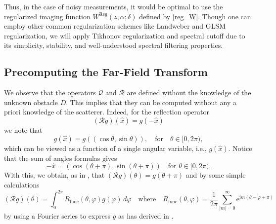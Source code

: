 \documentclass{article}
\begin{document}
Thus, in the case of noisy measurements, it would be optimal to use the regularized imaging function $W^{\mathrm{Reg}}(z,\alpha;\delta)$ defined by \eqref{reg_W}. Though one can employ other common regularization schemes like Landweber and GLSM regularization, we will apply Tikhonov regularization and spectral cutoff due to its simplicity, stability, and well-understood spectral filtering properties.
\subsection{Precomputing the Far-Field Transform}
We observe that the operators $\mathcal Q$ and $\mathcal R$ are defined without the knowledge of the unknown obstacle $D$. This implies that they can be computed without any a priori knowledge of the scatterer. Indeed, for the reflection operator 
\[
(\mathcal Rg)(\hat x)=g(-\hat x)
\]
we note that
\[
g(\hat x)=g((\cos \theta,\sin \theta)),\quad \text{for}\quad\theta\in [0,2\pi),
\]
which can be viewed as a function of a single angular variable, i.e., $g(\hat x)$. Notice that the sum of angles formulas gives
\[
- \hat x=(\cos(\theta+\pi),\sin(\theta+\pi))\quad \text{for }\theta\in[0,2\pi).
\]
With this, we obtain, as in \cite{HarrisKleefeld2026}, that $(\mathcal Rg)(\theta)=g(\theta+\pi)$ and by some simple calculations
\[
(\mathcal Rg)(\theta)=\int_0^{2\pi}R_{\mathrm{func}}(\theta,\varphi)g(\varphi)\,d\varphi\quad \text{where}\quad R_{\mathrm{func}}(\theta,\varphi)=\frac{1}{2\pi}\sum_{|m|=0}^\infty \mathrm{e}^{\mathrm im(\theta-\varphi+\pi)}
\]
by using a Fourier series to express $g$ as has derived in \cite{nf-fft-dsm}.
\end{document}
